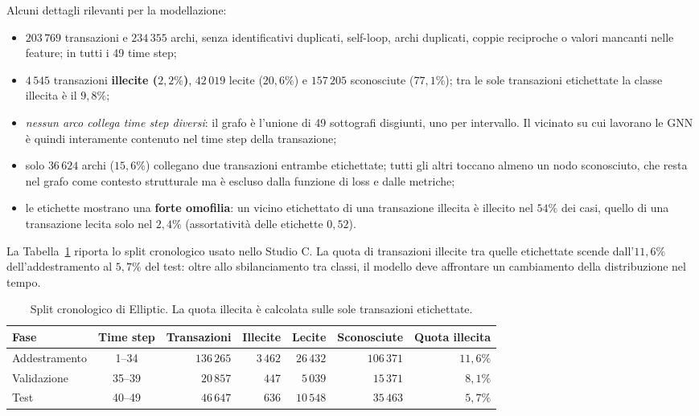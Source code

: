 \documentclass[11pt]{article}
\begin{document}
Alcuni dettagli rilevanti per la modellazione:
\begin{itemize}
  \item $203\,769$ transazioni e $234\,355$ archi, senza identificativi
  duplicati, self-loop, archi duplicati, coppie reciproche o valori mancanti
  nelle feature; in tutti i 49 time step;
  \item $4\,545$ transazioni \textbf{illecite ($2{,}2\%$)}, $42\,019$ lecite
  ($20{,}6\%$) e $157\,205$ sconosciute ($77{,}1\%$); tra le sole
  transazioni etichettate la classe illecita è il $9{,}8\%$;
  \item \emph{nessun arco collega time step diversi}: il grafo è
  l'unione di 49 sottografi disgiunti, uno per intervallo. Il vicinato su
  cui lavorano le GNN è quindi interamente contenuto nel time step della
  transazione;
  \item solo $36\,624$ archi ($15{,}6\%$) collegano due transazioni
  entrambe etichettate; tutti gli altri toccano almeno un nodo
  sconosciuto, che resta nel grafo come contesto strutturale ma è escluso
  dalla funzione di loss e dalle metriche;
  \item le etichette mostrano una \textbf{forte omofilia}: un vicino etichettato di
  una transazione illecita è illecito nel $54\%$ dei casi, quello di una
  transazione lecita solo nel $2{,}4\%$ (assortatività delle etichette
  $0{,}52$).
\end{itemize}

La Tabella~\ref{tab:elliptic_split} riporta lo split cronologico usato nello
Studio C. La quota di transazioni illecite tra quelle etichettate scende
dall'$11{,}6\%$ dell'addestramento al $5{,}7\%$ del test: oltre allo
sbilanciamento tra classi, il modello deve affrontare un cambiamento della
distribuzione nel tempo.

\begin{table}[H]
\centering
\caption{Split cronologico di Elliptic. La quota illecita è calcolata sulle
sole transazioni etichettate.}
\label{tab:elliptic_split}
\begin{tabular}{lcrrrrr}
\toprule
Fase & Time step & Transazioni & Illecite & Lecite & Sconosciute & Quota illecita \\
\midrule
Addestramento & 1--34  & $136\,265$ & $3\,462$ & $26\,432$ & $106\,371$ & $11{,}6\%$ \\
Validazione   & 35--39 & $20\,857$  & $447$    & $5\,039$  & $15\,371$  & $8{,}1\%$ \\
Test          & 40--49 & $46\,647$  & $636$    & $10\,548$ & $35\,463$  & $5{,}7\%$ \\
\bottomrule
\end{tabular}
\end{table}
\end{document}
